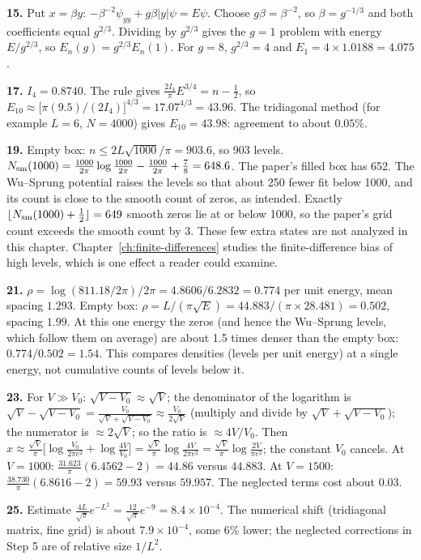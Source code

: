\textbf{15.} Put $x=\beta y$: $-\beta^{-2}\psi_{yy}+g\beta|y|\psi=E\psi$. Choose $g\beta=\beta^{-2}$, so $\beta=g^{-1/3}$ and both coefficients equal $g^{2/3}$. Dividing by $g^{2/3}$ gives the $g=1$ problem with energy $E/g^{2/3}$, so $E_n(g)=g^{2/3}E_n(1)$. For $g=8$, $g^{2/3}=4$ and $E_1=4\times1.0188=4.075$.

\textbf{17.} $I_4=0.8740$. The rule gives $\frac{2I_4}{\pi}E^{3/4}=n-\frac12$, so $E_{10}\approx\bigl[\pi(9.5)/(2I_4)\bigr]^{4/3}=17.07^{4/3}=43.96$. The tridiagonal method (for example $L=6$, $N=4000$) gives $E_{10}=43.98$: agreement to about $0.05\%$.

\textbf{19.} Empty box: $n\le2L\sqrt{1000}/\pi=903.6$, so 903 levels. $N_{\mathrm{sm}}(1000)=\frac{1000}{2\pi}\log\frac{1000}{2\pi}-\frac{1000}{2\pi}+\frac78=648.6$. The paper's filled box has 652. The Wu--Sprung potential raises the levels so that about 250 fewer fit below 1000, and its count is close to the smooth count of zeros, as intended. Exactly $\lfloor N_{\mathrm{sm}}(1000)+\tfrac12\rfloor=649$ smooth zeros lie at or below 1000, so the paper's grid count exceeds the smooth count by 3. These few extra states are not analyzed in this chapter. Chapter~\ref{ch:finite-differences} studies the finite-difference bias of high levels, which is one effect a reader could examine.

\textbf{21.} $\rho=\log(811.18/2\pi)/2\pi=4.8606/6.2832=0.774$ per unit energy, mean spacing $1.293$. Empty box: $\rho=L/(\pi\sqrt E)=44.883/(\pi\times28.481)=0.502$, spacing $1.99$. At this one energy the zeros (and hence the Wu--Sprung levels, which follow them on average) are about 1.5 times denser than the empty box: $0.774/0.502=1.54$. This compares densities (levels per unit energy) at a single energy, not cumulative counts of levels below it.

\textbf{23.} For $V\gg V_0$: $\sqrt{V-V_0}\approx\sqrt V$; the denominator of the logarithm is $\sqrt V-\sqrt{V-V_0}=\frac{V_0}{\sqrt V+\sqrt{V-V_0}}\approx\frac{V_0}{2\sqrt V}$ (multiply and divide by $\sqrt V+\sqrt{V-V_0}$); the numerator is $\approx2\sqrt V$; so the ratio is $\approx4V/V_0$. Then $x\approx\frac{\sqrt V}{\pi}\bigl[\log\frac{V_0}{2\pi e^2}+\log\frac{4V}{V_0}\bigr]=\frac{\sqrt V}{\pi}\log\frac{4V}{2\pi e^2}=\frac{\sqrt V}{\pi}\log\frac{2V}{\pi e^2}$; the constant $V_0$ cancels. At $V=1000$: $\frac{31.623}{\pi}(6.4562-2)=44.86$ versus $44.883$. At $V=1500$: $\frac{38.730}{\pi}(6.8616-2)=59.93$ versus $59.957$. The neglected terms cost about $0.03$.

\textbf{25.} Estimate $\frac{4L}{\sqrt\pi}e^{-L^2}=\frac{12}{\sqrt\pi}e^{-9}=8.4\times10^{-4}$. The numerical shift (tridiagonal matrix, fine grid) is about $7.9\times10^{-4}$, some 6\% lower; the neglected corrections in Step 5 are of relative size $1/L^2$.

